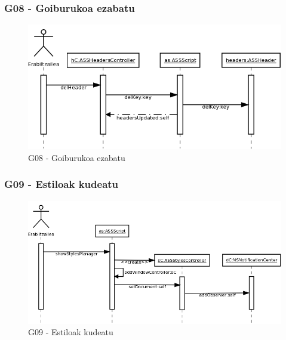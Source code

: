 \subsubsection{G08 - Goiburukoa ezabatu}
\begin{figure}[htp]
\begin{center}
\includegraphics[scale=0.4]{Pictures/Chapter4/Diseinua/G08.png}
\caption{G08 - Goiburukoa ezabatu}
\label{g08d}
\end{center}
\end{figure}


\subsubsection{G09 - Estiloak kudeatu}
\begin{figure}[htp]
\begin{center}
\includegraphics[scale=0.35]{Pictures/Chapter4/Diseinua/G09.png}
\caption{G09 - Estiloak kudeatu}
\label{g09d}
\end{center}
\end{figure}

\newpage
